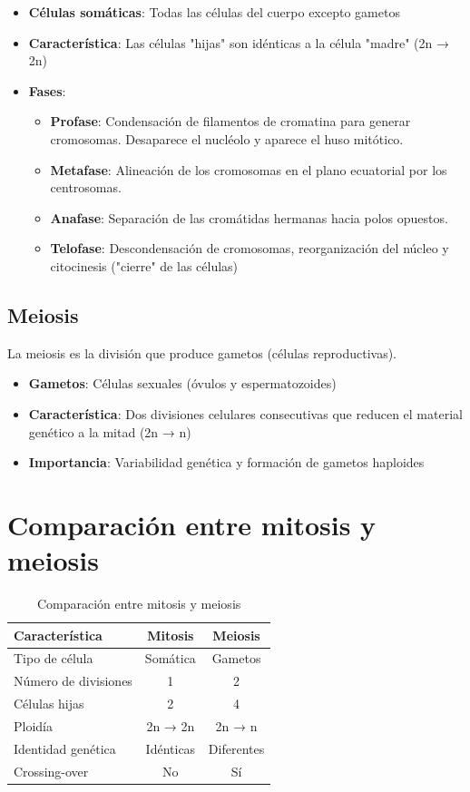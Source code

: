\begin{itemize}
    \item \textbf{Células somáticas}: Todas las células del cuerpo excepto gametos
    \item \textbf{Característica}: Las células "hijas" son idénticas a la célula "madre" (2n → 2n)
    \item \textbf{Fases}:
        \begin{itemize}
            \item \textbf{Profase}: Condensación de filamentos de cromatina para generar cromosomas. Desaparece el nucléolo y aparece el huso mitótico.
            \item \textbf{Metafase}: Alineación de los cromosomas en el plano ecuatorial por los centrosomas.
            \item \textbf{Anafase}: Separación de las cromátidas hermanas hacia polos opuestos.
            \item \textbf{Telofase}: Descondensación de cromosomas, reorganización del núcleo y citocinesis ("cierre" de las células)
        \end{itemize}
\end{itemize}

\subsection{Meiosis}
La meiosis es la división que produce gametos (células reproductivas).

\begin{itemize}
    \item \textbf{Gametos}: Células sexuales (óvulos y espermatozoides)
    \item \textbf{Característica}: Dos divisiones celulares consecutivas que reducen el material genético a la mitad (2n → n)
    \item \textbf{Importancia}: Variabilidad genética y formación de gametos haploides
\end{itemize}

\section{Comparación entre mitosis y meiosis}

\begin{table}[h]
\centering
\begin{tabular}{|l|c|c|}
\hline
\textbf{Característica} & \textbf{Mitosis} & \textbf{Meiosis} \\
\hline
Tipo de célula & Somática & Gametos \\
\hline
Número de divisiones & 1 & 2 \\
\hline
Células hijas & 2 & 4 \\
\hline
Ploidía & 2n → 2n & 2n → n \\
\hline
Identidad genética & Idénticas & Diferentes \\
\hline
Crossing-over & No & Sí \\
\hline
\end{tabular}
\caption{Comparación entre mitosis y meiosis}
\end{table}

